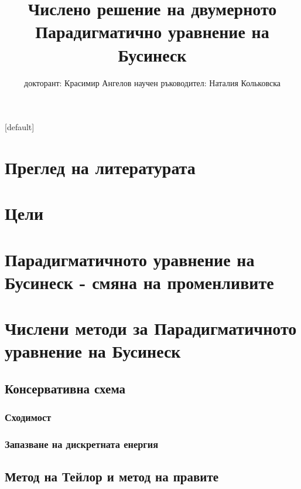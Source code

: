 \documentclass{beamer}
\begin{document}
\title{Числено решение на двумерното Парадигматично уравнение на Бусинеск}

\author{докторант: Красимир Ангелов 
\newline \newline научен ръководител: Наталия Кольковска}

\begin{frame}
\titlepage
\end{frame}

\begin{frame}
\tableofcontents 
{}[default]
\section{Преглед на литературата}
\section{Цели}
\section{Парадигматичното уравнение на Бусинеск - смяна на променливите}
\section{Числени методи за Парадигматичното уравнение на Бусинеск}
\subsection{Консервативна схема}
\subsubsection{Сходимост}
\subsubsection{Запазване на дискретната енергия}
\subsection{Метод на Тейлор и метод на правите}

\end{frame}
\end{document}
